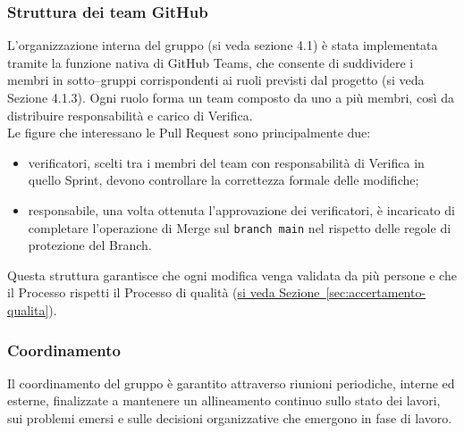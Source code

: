 \documentclass[a4paper,12pt]{article}
\begin{document}
\subsubsection{Struttura dei team GitHub} \label{sec:github-teams}
L’organizzazione interna del gruppo (si veda sezione 4.1) è stata implementata tramite la funzione nativa di GitHub Teams, che consente di suddividere i membri in sotto–gruppi corrispondenti ai ruoli previsti dal progetto (si veda Sezione 4.1.3). Ogni ruolo forma un team composto da uno a più membri, così da distribuire responsabilità e carico di Verifica.\\
Le figure che interessano le Pull Request sono principalmente due:
\begin{itemize}
    \item verificatori, scelti tra i membri del team con responsabilità di Verifica in quello Sprint, devono controllare la correttezza formale delle modifiche;
    \item responsabile, una volta ottenuta l’approvazione dei verificatori, è incaricato di completare l’operazione di Merge sul \texttt{branch main} nel rispetto delle regole di protezione del Branch.
\end{itemize}
Questa struttura garantisce che ogni modifica venga validata da più persone e che il Processo rispetti il Processo di qualità (\hyperref[sec:accertamento-qualita]{si veda Sezione~\ref*{sec:accertamento-qualita}}).

\subsubsection{Coordinamento}
Il coordinamento del gruppo è garantito attraverso riunioni periodiche, interne ed esterne, finalizzate a mantenere un allineamento continuo sullo stato dei lavori, sui problemi emersi e sulle decisioni organizzative che emergono in fase di lavoro.
\end{document}
